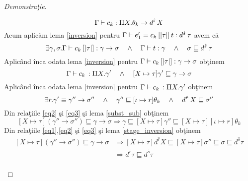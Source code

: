 \begin{proof}[Demonstra\c tie]
\begin{description}
\begin{enumerate*}
\begin{equation}
                 \Gamma \vdash c_k : \Pi X. \theta_k \to d^{\hat{\iota}}\hspace{2pt} X
                 \end{equation}
            Acum aplic\u am lema \ref{inversion} pentru $\Gamma \vdash e_1' = c_k\hspace{2pt}[|\tau|]\hspace{2pt} t : d^{\hat{s}}\hspace{2pt}\tau$ avem c\u a
            \begin{equation} \label{eq1}
            \exists \gamma,\sigma.
                \Gamma \vdash c_k\hspace{2pt} [|\tau|] : \gamma \to \sigma  \quad \wedge \quad
                \Gamma \vdash t : \gamma \quad \wedge \quad
                \sigma \sqsubseteq d^{\hat{s}}\hspace{2pt} \tau
            \end{equation}
            Aplic\^ and \^ inca odata lema \ref{inversion} pentru $\Gamma \vdash c_k\hspace{2pt} [|\tau|] : \gamma \to \sigma$ ob\c tinem
            \begin{equation}\label{eq2}
                \Gamma \vdash c_k\hspace{2pt} : \Pi X. \gamma' \quad \wedge \quad
                [X\mapsto \tau] \gamma' \sqsubseteq \gamma \to \sigma
            \end{equation}
            Aplic\^ and \^ inca odata lema \ref{inversion} pentru $\Gamma \vdash c_k\hspace{2pt} : \Pi X. \gamma' $ ob\c tinem
            \begin{equation}  \label{eq3}
                \exists r.\gamma' \equiv \gamma'' \to \sigma'' \quad \wedge \quad
                \gamma'' \sqsubseteq [\iota \mapsto r] \theta_k \quad \wedge \quad
                d^{\hat{r}}\hspace{2pt} X \sqsubseteq \sigma''
            \end{equation}
            Din rela\c tiile \eqref{eq2} \c si \eqref{eq3} \c si lema \ref{subst_sub} ob\c tinem
            \begin{equation} \label{eq4}
                [X \mapsto \tau] (\gamma'' \to \sigma'') \sqsubseteq \gamma \to \sigma \Rightarrow \gamma \sqsubseteq [X \mapsto \tau] \gamma'' \sqsubseteq [X \mapsto \tau][\iota \mapsto r] \theta_k
            \end{equation}
            Din rela\c tiile \eqref{eq1},\eqref{eq2} \c si \eqref{eq3} \c si lema \ref{stage_inversion} ob\c tinem
            \begin{equation} \label{eq5}
            \begin{split}
                [X \mapsto \tau] (\gamma'' \to \sigma'') \sqsubseteq \gamma \to \sigma
                    &\Rightarrow [X \mapsto \tau] d^{\hat{r}} X \sqsubseteq [X \mapsto \tau] \sigma'' \sqsubseteq \sigma \sqsubseteq d^{\hat{s}} \tau \\
                    &\Rightarrow d^{\hat{r}} \tau \sqsubseteq d^{\hat{s}} \tau\\

\end{split}
\end{equation}
\end{enumerate*}
\end{description}
\end{proof}
